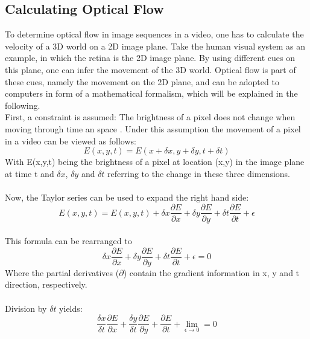 \documentclass[Bachelorarbeit.tex]{subfiles}
\begin{document}
\subsection{Calculating Optical Flow}
To determine optical flow in image sequences in a video, one has to calculate the velocity of a 3D world on a 2D image plane. Take the human visual system as an example, in which the retina is the 2D image plane. By using different cues on this plane, one can infer the movement of the 3D world. Optical flow is part of these cues, namely the movement on the 2D plane, and can be adopted to computers in form of a mathematical formalism, which will be explained in the following. 
\\First, a constraint is assumed: The brightness of a pixel does not change when moving through time an space \citep[p.187]{horn1981determining}. 
Under this assumption the movement of a pixel in a video can be viewed as follows:
\begin{equation}
E(x,y,t) = E(x + \delta x, y + \delta y, t + \delta t)
\end{equation}
With E(x,y,t) being the brightness of a pixel at location (x,y) in the image plane at time t and $\delta x$, $\delta y$ and $\delta t$ referring to the change in these three dimensions. \\ \\
Now, the Taylor series can be used to expand the right hand side:
\begin{equation*}
E(x,y,t) = E(x,y,t) + \delta x \frac{\partial E}{\partial x} + \delta y \frac{\partial E}{\partial y} + \delta t \frac{\partial E}{\partial t} + \epsilon
\end{equation*}
\\This formula can be rearranged to\\
\begin{equation*}
\delta x \frac{\partial E}{\partial x} + \delta y \frac{\partial E}{\partial y} + \delta t \frac{\partial E}{\partial t} + \epsilon = 0
\end{equation*}
Where the partial derivatives ($\partial$) contain the gradient information in x, y and t direction, respectively.\\
\\Division by $\delta t$ yields:\\
\begin{equation*}
\frac{\delta x}{\delta t} \frac{\partial E}{\partial x} + \frac{\delta y}{\delta t} \frac{\partial E}{\partial y} + \frac{\partial E}{\partial t} + \displaystyle{\lim_{\epsilon \to 0}} = 0 
\end{equation*}
\end{document}
